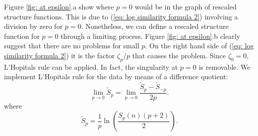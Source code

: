 Figure \ref{fig: at epsilon}.a show where $p = 0$ would be in the graph of rescaled structure functions.  This is due to (\ref{eq: log similarity formula 2}) involving a division by zero for $p = 0$.  Nonetheless, we can define a rescaled structure function for $p = 0$ through a limiting process.  Figure \ref{fig: at epsilon}.b clearly suggest that there are no problems for small $p$.  On the right hand side of (\ref{eq: log similarity formula 2}) it is the factor $\zeta_p/p$ that causes the problem.  Since $\zeta_0 = 0$, L'Hopitals rule can be applied.  In fact, the singularity at $p = 0$ is removable. We implement L'Hopitals rule for the data by means of a difference quotient:
\begin{equation}
    \lim_{p \rightarrow 0}\tilde{S}_p = \lim_{p \rightarrow 0}\frac{\tilde{S}_p - \tilde{S}_{-p}}{2p}.
\end{equation}
where
\begin{equation}
    \tilde{S}_p = \frac{1}{p}\ln\left(\frac{S_{p}(n)(p+2)}{2}\right).
\end{equation}


